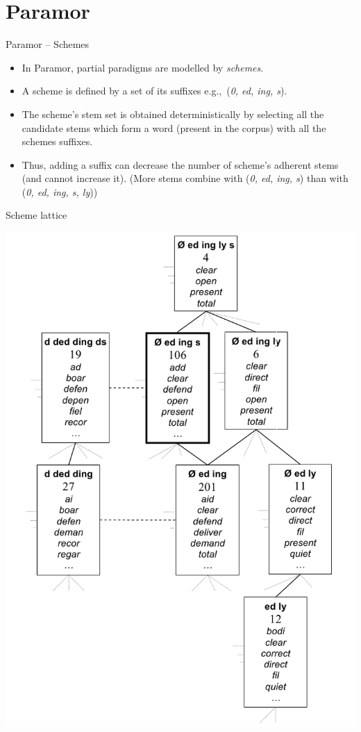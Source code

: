 \documentclass[hyperref={pdfencoding=unicode, unicode=true}, xcolor=dvipsnames]{beamer}
\newcommand{\eg}{e.g.,~}
\begin{document}
\section{Paramor}

\begin{frame}{Paramor -- Schemes}
\begin{itemize}
\item In Paramor, partial paradigms are modelled by \emph{schemes}. 
\item A scheme is defined by a set of its suffixes \eg (\emph{0, ed, ing, s}).
\item The scheme's stem set is obtained deterministically by selecting all the candidate stems which form a word (present in the corpus) with all the schemes suffixes.
\item Thus, adding a suffix can decrease the number of scheme's adherent stems (and cannot increase it). (More stems combine with (\emph{0, ed, ing, s}) than with (\emph{0, ed, ing, s, ly}))
\end{itemize}
\end{frame}

\begin{frame}{Scheme lattice}
\vspace{-8pt}
\begin{center}
\includegraphics[scale=0.25]{schemeLattice.png}
\end{center}

\end{frame}
\end{document}
